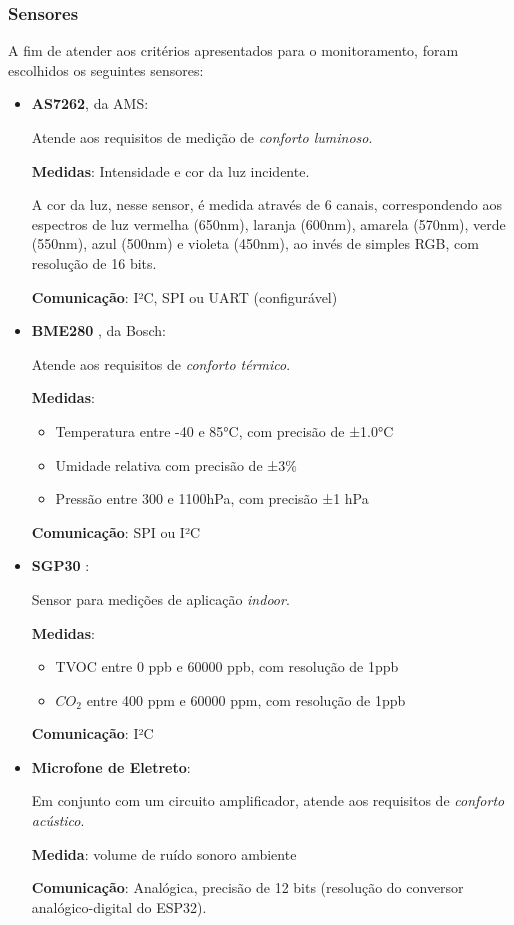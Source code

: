 \documentclass[../monografia.tex]{subfiles}
\begin{document}
\subsubsection{Sensores}
A fim de atender aos critérios apresentados para o monitoramento, foram escolhidos os seguintes sensores: 
\begin{itemize}
\item \textbf{AS7262}\cite{as7262}, da AMS: 

Atende aos requisitos de medição de \textit{conforto luminoso}. 

\textbf{Medidas}: Intensidade e cor da luz incidente.

A cor da luz, nesse sensor, é medida através de 6 canais, correspondendo aos espectros de luz vermelha (650nm), laranja (600nm), amarela (570nm), verde (550nm), azul (500nm) e violeta (450nm), ao invés de simples RGB, com resolução de 16 bits.

\textbf{Comunicação}: I²C, SPI ou UART (configurável)

\item \textbf{BME280} \cite{bme280}, da Bosch: 

Atende aos requisitos de \textit{conforto térmico}. 

\textbf{Medidas}: 
    \begin{itemize}
    \item Temperatura entre -40 e 85°C, com precisão de ±1.0°C
    \item Umidade relativa com precisão de ±3\%
    \item Pressão entre 300 e 1100hPa, com precisão ±1 hPa
    \end{itemize}

\textbf{Comunicação}: SPI ou I²C

\item \textbf{SGP30} \cite{sgp30}:

Sensor para medições de aplicação \textit{indoor}. 

\textbf{Medidas}:
    \begin{itemize}
    \item TVOC entre 0 ppb e 60000 ppb, com resolução de 1ppb
    \item $CO_{2}$ entre 400 ppm e 60000 ppm, com resolução de 1ppb
    \end{itemize}

\textbf{Comunicação}: I²C

\item \textbf{Microfone de Eletreto}:

Em conjunto com um circuito amplificador, atende aos requisitos de \textit{conforto acústico}. 

\textbf{Medida}: volume de ruído sonoro ambiente

\textbf{Comunicação}: Analógica, precisão de 12 bits (resolução do conversor analógico-digital do ESP32). 
\end{itemize}
\end{document}
